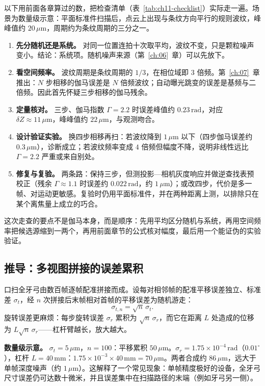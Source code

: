 以下用前面各章算过的数，把检查清单（表~\ref{tab:ch11-checklist}）实际走一遍。场景为数量级示意：平面标准件扫描后，点云上出现与条纹方向平行的规则波纹，峰峰值约 $20\,\mu\mathrm{m}$，周期约为条纹周期的三分之一。

\begin{enumerate}
  \item \textbf{先分随机还是系统。} 对同一位置连拍十次取平均，波纹不变，只是颗粒噪声变小。结论：系统项。随机噪声来源（第~\ref{ch:06}~章）可以先放下。
  \item \textbf{看空间频率。} 波纹周期是条纹周期的 $1/3$，在相位域即 $3$ 倍频。第~\ref{ch:07}~章推出：$N$ 步相移的伽马误差是 $N$ 倍频波纹；自动曝光跳变的误差是基频与二倍频。因此首先怀疑三步相移的伽马残余。
  \item \textbf{定量核对。} 三步、伽马指数 $\Gamma=2.2$ 时误差峰值约 $0.23\,\mathrm{rad}$，对应 $\delta Z\approx11\,\mu\mathrm{m}$，峰峰值约 $22\,\mu\mathrm{m}$，与观测吻合。
  \item \textbf{设计验证实验。} 换四步相移再扫：若波纹降到 $1\,\mu\mathrm{m}$ 以下（四步伽马误差约 $0.3\,\mu\mathrm{m}$），诊断成立；若波纹频率变成 $4$ 倍频但幅度不降，说明非线性远比 $\Gamma=2.2$ 严重或来自别处。
  \item \textbf{修复与复验。} 两条路：保持三步，但测投影—相机灰度响应并做逆查找表预校正（残余 $\Gamma\approx1.1$ 时误差约 $0.022\,\mathrm{rad}$，约 $1\,\mu\mathrm{m}$）；或改四步，代价是多一帧、对运动更敏感。复验时仍用平面标准件，并在两种距离上测，以排除只在某个离焦量上成立的巧合。
\end{enumerate}
这次走查的要点不是伽马本身，而是顺序：先用平均区分随机与系统，再用空间频率把候选源缩到一两个，再用前面章节的公式核对幅度，最后用一个能证伪的实验验证。

\subsection{推导：多视图拼接的误差累积}

口扫全牙弓由数百帧逐帧配准拼接而成。设每对相邻帧的配准平移误差独立、标准差 $\sigma_t$，经 $n$ 次拼接后末帧相对首帧的平移误差为随机游走：
\[
  \sigma_{t,n}=\sqrt n\,\sigma_t .
\]
旋转误差更麻烦：每步旋转误差 $\sigma_r$ 累积为 $\sqrt n\,\sigma_r$，而它在距离 $L$ 处造成的位移为 $L\sqrt n\,\sigma_r$——杠杆臂越长，放大越大。

\textbf{数量级示意。} $\sigma_t=5\,\mu\mathrm{m}$，$n=100$：平移累积 $50\,\mu\mathrm{m}$。$\sigma_r=1.75\times10^{-4}\,\mathrm{rad}$（$0.01^\circ$），杠杆 $L=40\,\mathrm{mm}$：$1.75\times10^{-3}\times40\,\mathrm{mm}=70\,\mu\mathrm{m}$。两者合成约 $86\,\mu\mathrm{m}$，远大于单帧深度噪声（约 $1\,\mu\mathrm{m}$）。这解释了一个常见现象：单帧精度极好的设备，全牙弓尺寸误差仍可达数十微米，并且误差集中在扫描路径的末端（例如牙弓另一侧）。

